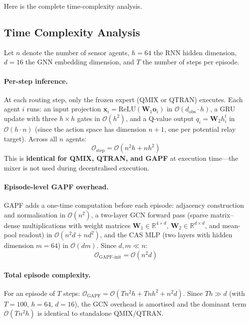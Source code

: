 \documentclass[12pt, onecolumn, journal]{IEEEtran}
\begin{document}
Here is the complete time-complexity analysis. 
\subsection{Time Complexity Analysis}
\label{sec:complexity}

Let $n$ denote the number of sensor agents, $h = 64$ the RNN hidden dimension, $d = 16$ the GNN embedding dimension, and $T$ the number of steps per episode.

\paragraph{Per-step inference.}
At each routing step, only the frozen expert (QMIX or QTRAN) executes. Each agent $i$ runs: an input projection $\mathbf{x}_i = \text{ReLU}(\mathbf{W}_1 \mathbf{o}_i)$ in $\mathcal{O}(d_{\text{obs}} \cdot h)$, a GRU update with three $h \times h$ gates in $\mathcal{O}(h^2)$, and a Q-value output $q_i = \mathbf{W}_2 h_i^t$ in $\mathcal{O}(h \cdot n)$ (since the action space has dimension $n+1$, one per potential relay target). Across all $n$ agents:
\begin{equation}
\boxed{\mathcal{O}_{\text{step}} = \mathcal{O}(n^2 h + n h^2)}
\end{equation}
This is \textbf{identical for QMIX, QTRAN, and GAPF} at execution time---the mixer is not used during decentralised execution.

\paragraph{Episode-level GAPF overhead.}
GAPF adds a one-time computation before each episode: adjacency construction and normalisation in $\mathcal{O}(n^2)$, a two-layer GCN forward pass (sparse matrix--dense multiplications with weight matrices $\mathbf{W}_1 \in \mathbb{R}^{4 \times d}$, $\mathbf{W}_2 \in \mathbb{R}^{d \times d}$, and mean-pool readout) in $\mathcal{O}(n^2 d + n d^2)$, and the CAS MLP (two layers with hidden dimension $m = 64$) in $\mathcal{O}(dm)$. Since $d, m \ll n$:
\begin{equation}
\boxed{\mathcal{O}_{\text{GAPF-init}} = \mathcal{O}(n^2 d)}
\end{equation}

\paragraph{Total episode complexity.}
For an episode of $T$ steps: $\mathcal{O}_{\text{GAPF}} = \mathcal{O}(Tn^2 h + Tnh^2 + n^2 d)$. Since $Th \gg d$ (with $T = 100$, $h = 64$, $d = 16$), the GCN overhead is amortised and the dominant term $\mathcal{O}(Tn^2 h)$ is identical to standalone QMIX/QTRAN.
\end{document}

